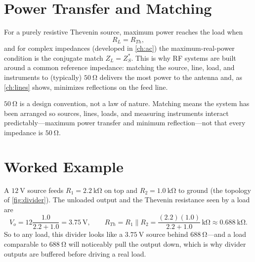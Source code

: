 \section{Power Transfer and Matching}
For a purely resistive Thevenin source, maximum power reaches the load when
\[
R_L=R_{Th},
\]
and for complex impedances (developed in \cref{ch:ac}) the maximum-real-power
condition is the conjugate match \(Z_L=Z_S^{*}\). This is why RF systems are built
around a common reference
impedance: matching the source, line, load, and instruments to (typically)
\(\SI{50}{\ohm}\) delivers the most power to the antenna and, as \cref{ch:lines}
shows, minimizes reflections on the feed line.

\begin{exambox}
\(\SI{50}{\ohm}\) is a design convention, not a law of nature. Matching means the
system has been arranged so sources, lines, loads, and measuring instruments
interact predictably---maximum power transfer and minimum reflection---not that
every impedance is \(\SI{50}{\ohm}\).
\end{exambox}

\section{Worked Example}
A \(\SI{12}{\volt}\) source feeds \(R_1=\SI{2.2}{\kilo\ohm}\) on top and
\(R_2=\SI{1.0}{\kilo\ohm}\) to ground (the topology of \cref{fig:divider}). The
unloaded output and the Thevenin resistance seen by a load are
\[
V_o=12\frac{1.0}{2.2+1.0}=\SI{3.75}{\volt},
\qquad
R_{Th}=R_1\parallel R_2=\frac{(2.2)(1.0)}{2.2+1.0}\,\si{\kilo\ohm}
\approx\SI{0.688}{\kilo\ohm}.
\]
So to any load, this divider looks like a \(\SI{3.75}{\volt}\) source behind
\(\SI{688}{\ohm}\)---and a load comparable to \(\SI{688}{\ohm}\) will noticeably
pull the output down, which is why divider outputs are buffered before driving a
real load.
